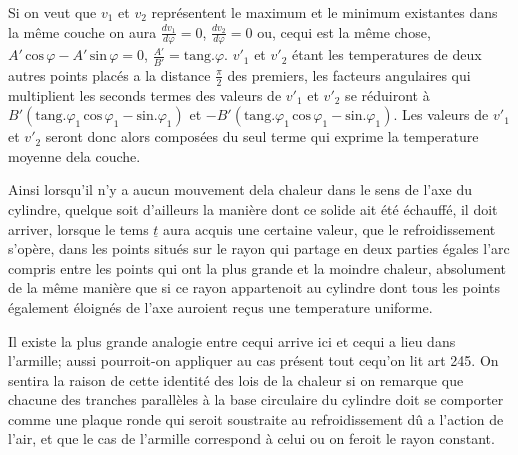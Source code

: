 \documentclass[11pt,a4paper]{article}
\begin{document}
Si on veut que $v_1$ et $v_2$ représentent le maximum et le minimum
existantes dans la même couche on aura $\frac{dv_1}{d\varphi} = 0$, $\frac{dv_2}{d\varphi} = 0$ ou, cequi
est la même chose, $A'\,\text{cos}\,\varphi - A'\,\text{sin}\,\varphi = 0$, $\frac{A'}{B'} = \text{tang}.\varphi$. $v'_1$ et $v'_2$
étant les temperatures de deux autres points placés a la distance
$\frac{\pi}{2}$ des premiers, les facteurs angulaires qui multiplient les seconds
termes des valeurs de $v'_1$ et $v'_2$ se réduiront à $B'(\text{tang}.\varphi_1\,\text{cos}\,\varphi_1 - \text{sin}.\varphi_1)$
et $-B'(\text{tang}.\varphi_1\,\text{cos}\,\varphi_1 - \text{sin}.\varphi_1)$. Les valeurs de $v'_1$ et $v'_2$ seront
donc alors composées du seul terme qui exprime la temperature
moyenne dela couche.

Ainsi lorsqu'il n'y a aucun mouvement dela chaleur dans le sens
de l'axe du cylindre, quelque soit d'ailleurs la manière dont ce
solide ait été échauffé, il doit arriver, lorsque le tems $\underline{t}$
aura acquis une certaine valeur, que le refroidissement s'opère,
dans les points situés sur le rayon qui partage en deux parties
égales l'arc compris entre les points qui ont la plus grande
et la moindre chaleur, absolument de la même manière
que si ce rayon appartenoit au cylindre dont tous les points également
éloignés de l'axe auroient reçus une temperature uniforme.

Il existe la plus grande analogie entre cequi arrive ici et cequi a lieu
dans l'armille; aussi pourroit-on appliquer au cas présent tout
cequ'on lit art 245. On sentira la raison de cette identité des
lois de la chaleur si on remarque que chacune des tranches parallèles à
la base circulaire du cylindre doit se comporter comme une plaque
ronde qui seroit soustraite au refroidissement dû a l'action de l'air, et que
le cas de l'armille correspond à celui ou on feroit le rayon constant.
\end{document}
